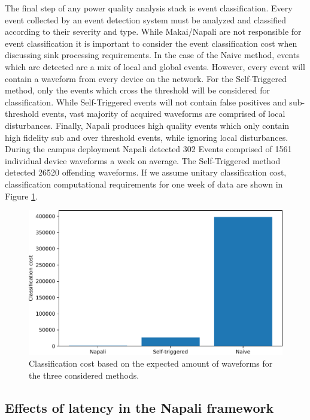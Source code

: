 The final step of any power quality analysis stack is event classification.
Every event collected by an event detection system must be analyzed and classified according to their severity and type.
While Makai/Napali are not responsible for event classification it is important to consider the event classification cost when discussing sink processing requirements.
In the case of the Naive method, events which are detected are a mix of local and global events.
However, every event will contain a waveform from every device on the network.
For the Self-Triggered method, only the events which cross the threshold will be considered for classification.
While Self-Triggered events will not contain false positives and sub-threshold events, vast majority of acquired waveforms are comprised of local disturbances.
Finally, Napali produces high quality events which only contain high fidelity sub and over threshold events, while ignoring local disturbances.
During the campus deployment Napali detected 302 Events comprised of 1561 individual device waveforms a week on average.
The Self-Triggered method detected 26520 offending waveforms.
If we assume unitary classification cost, classification computational requirements for one week of data are shown in Figure \ref{expdes:fig:classification}.
\begin{figure}[h]
    \centering
    \includegraphics[width=0.8\linewidth]{img/napali_eval/classification_cost.pdf}
    \caption{Classification cost based on the expected amount of waveforms for the three considered methods.}
    \label{expdes:fig:classification}
\end{figure}


\subsection{Effects of latency in the Napali framework}\label{subsec:effects-of-latency-in-the-napali-framework}

